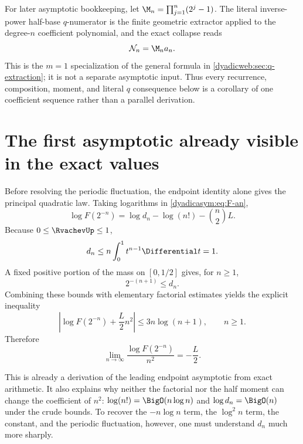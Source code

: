 \documentclass[11pt,oneside]{article}
\theoremstyle{definition}
\theoremstyle{remark}
\begin{document}
For later asymptotic bookkeeping, let
\(\M_n=\prod_{j=1}^n(2^j-1)\).  The literal inverse-power half-base
$q$-numerator is the finite geometric extractor applied to the degree-$n$ coefficient
polynomial, and the exact collapse reads
\begin{equation}
 \mathcal N_n=\M_na_n.                                    \label{dyadicasym:eq:N-m-a}
\end{equation}
This is the $m=1$ specialization of the general formula in
\cref{dyadicweb:sec:q-extraction}; it is not a separate asymptotic input.  Thus every
recurrence, composition, moment, and literal $q$ consequence below is a corollary of one
coefficient sequence rather than a parallel derivation.

\section{The first asymptotic already visible in the exact values}
\label{dyadicasym:sec:coarse}

Before resolving the periodic fluctuation, the endpoint identity alone gives the principal
quadratic law.  Taking logarithms in \eqref{dyadicasym:eq:F-an},
\begin{equation}
 \log F(2^{-n})=\log d_n-\log(n!)-\binom n2L.               \label{dyadicasym:eq:log-F-exact}
\end{equation}
Because $0\le\RvachevUp\le1$,
\begin{equation}
 d_n\le n\int_0^1t^{n-1}\Differential t=1.                           \label{dyadicasym:eq:dn-upper}
\end{equation}
A fixed positive portion of the mass on $[0,1/2]$ gives, for $n\ge1$,
\begin{equation}
 2^{-(n+1)}\le d_n.                                         \label{dyadicasym:eq:dn-lower}
\end{equation}
Combining these bounds with elementary factorial estimates yields the explicit inequality
\begin{equation}
 \left|\log F(2^{-n})+\frac L2n^2\right|
 \le3n\log(n+1),\qquad n\ge1.                              \label{dyadicasym:eq:coarse-bound}
\end{equation}
Therefore
\begin{equation}
 \lim_{n\to\infty}\frac{\log F(2^{-n})}{n^2}=-\frac L2.    \label{dyadicasym:eq:coarse-limit}
\end{equation}

This is already a derivation of the leading endpoint asymptotic from exact arithmetic.  It
also explains why neither the factorial nor the half moment can change the coefficient of
$n^2$: $\log(n!)=\BigO(n\log n)$ and $\log d_n=\BigO(n)$ under the crude bounds.  To recover
the $-n\log n$ term, the $\log^2n$ term, the constant, and the periodic fluctuation, however,
one must understand $d_n$ much more sharply.
\end{document}
